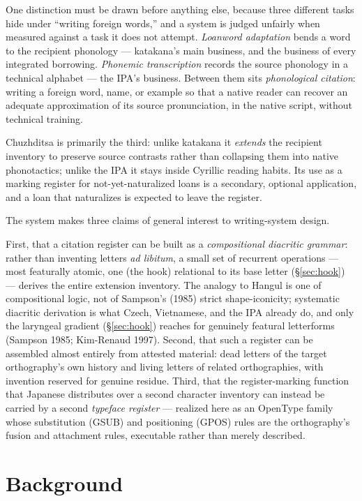 \documentclass[12pt]{article}
\begin{document}
One distinction must be drawn before anything else, because three different tasks hide under ``writing foreign words,'' and a system is judged unfairly when measured against a task it does not attempt. \emph{Loanword adaptation} bends a word to the recipient phonology — katakana's main business, and the business of every integrated borrowing. \emph{Phonemic transcription} records the source phonology in a technical alphabet — the IPA's business. Between them sits \emph{phonological citation}: writing a foreign word, name, or example so that a native reader can recover an adequate approximation of its source pronunciation, in the native script, without technical training.

Chuzhditsa is primarily the third: unlike katakana it \emph{extends} the recipient inventory to preserve source contrasts rather than collapsing them into native phonotactics; unlike the IPA it stays inside Cyrillic reading habits. Its use as a marking register for not-yet-naturalized loans is a secondary, optional application, and a loan that naturalizes is expected to leave the register.

The system makes three claims of general interest to writing-system design.

First, that a citation register can be built as a \emph{compositional diacritic grammar}: rather than inventing letters \emph{ad libitum}, a small set of recurrent operations — most featurally atomic, one (the hook) relational to its base letter (\S\ref{sec:hook}) — derives the entire extension inventory. The analogy to Hangul is one of compositional logic, not of Sampson's (1985) strict shape-iconicity; systematic diacritic derivation is what Czech, Vietnamese, and the IPA already do, and only the laryngeal gradient (\S\ref{sec:hook}) reaches for genuinely featural letterforms (Sampson 1985; Kim-Renaud 1997). Second, that such a register can be assembled almost entirely from attested material: dead letters of the target orthography's own history and living letters of related orthographies, with invention reserved for genuine residue. Third, that the register-marking function that Japanese distributes over a second character inventory can instead be carried by a second \emph{typeface register} — realized here as an OpenType family whose substitution (GSUB) and positioning (GPOS) rules are the orthography's fusion and attachment rules, executable rather than merely described.

\section{Background}
\end{document}

